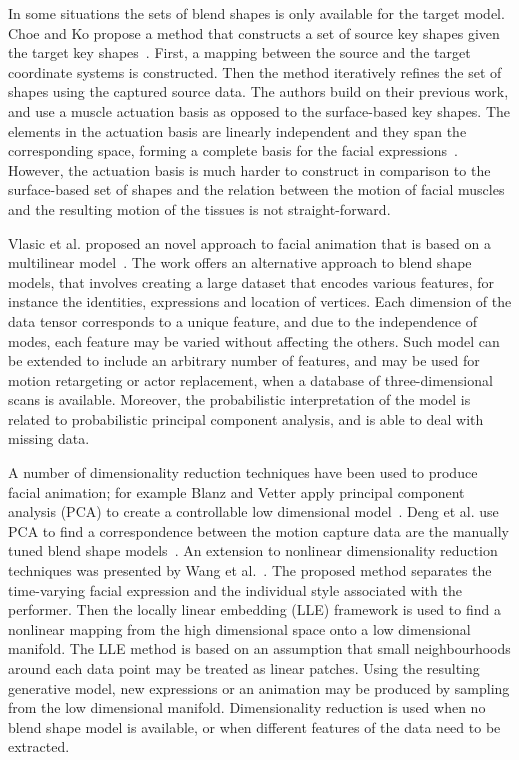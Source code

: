 \documentclass[11pt]{report}
\begin{document}
In some situations the sets of blend shapes is only available for the target model. Choe and Ko propose a method that constructs a set of source key shapes given the target key shapes~\cite{Choe:2005}. First, a mapping between the source and the target coordinate systems is constructed. Then the method iteratively refines the set of shapes using the captured source data. The authors build on their previous work, and use a muscle actuation basis as opposed to the surface-based key shapes. The elements in the actuation basis are linearly independent and they span the corresponding space, forming a complete basis for the facial expressions~\cite{Choe:2001}. However, the actuation basis is much harder to construct in comparison to the surface-based  set of shapes and the relation between the motion of facial muscles and the resulting motion of the tissues is not straight-forward.

Vlasic et al. proposed an novel approach to facial animation that is based on a multilinear model~\cite{Vlasic:2005}. The work offers an alternative approach to blend shape models, that involves creating a large dataset that encodes various features, for instance the identities, expressions and location of vertices. Each dimension of the data tensor corresponds to a unique feature, and due to the independence of modes, each feature may be varied without affecting the others. Such model can be extended to include an arbitrary number of features, and may be used for motion retargeting or actor replacement, when a database of three-dimensional scans is available. Moreover, the probabilistic interpretation of the model is related to probabilistic principal component analysis, and is able to deal with missing data. 

A number of dimensionality reduction techniques have been used to produce facial animation; for example Blanz and Vetter apply principal component analysis (PCA) to create a controllable low dimensional model~\cite{Blanz:1999}. Deng et al. use PCA to find a correspondence between the motion capture data are the manually tuned blend shape models~\cite{Deng:2006}. An extension to nonlinear dimensionality reduction techniques was presented by Wang et al.~\cite{Wang:2004}. The proposed method separates the time-varying facial expression and the individual style associated with the performer. Then the locally linear embedding (LLE) framework is used to find a nonlinear mapping from the high dimensional space onto a low dimensional manifold. The LLE method is based on an assumption that small neighbourhoods around each data point may be treated as linear patches. Using the resulting generative model, new expressions or an animation may be produced by sampling from the low dimensional manifold.
Dimensionality reduction is used when no blend shape model is available, or when different features of the data need to be extracted.
\end{document}
